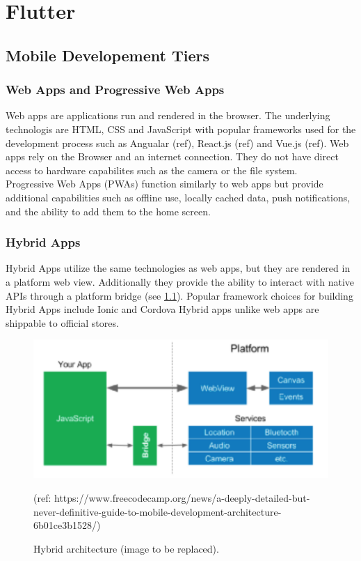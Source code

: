 \chapter{Flutter}

\section{Mobile Developement Tiers} \label{section::other_architectures}
\subsection{Web Apps and Progressive Web Apps}
Web apps are applications run and rendered in the browser. The underlying technologis are HTML, CSS and JavaScript with popular frameworks 
used for the development process such as Angualar (ref), React.js (ref) and Vue.js (ref). Web apps rely on the Browser and an internet connection.
They do not have direct access to hardware capabilites such as the camera or the file system.\\
Progressive Web Apps (PWAs) function similarly to web apps but provide additional capabilities such as offline use, locally cached data, 
push notifications, and the ability to add them to the home screen.

\subsection{Hybrid Apps}
Hybrid Apps utilize the same technologies as web apps, but they are rendered in a platform web view. Additionally they provide the ability to 
interact with native APIs through a platform bridge (see \ref{fig:hybrid_architecture}). 
Popular framework choices for building Hybrid Apps include Ionic and Cordova 
Hybrid apps unlike web apps are shippable to official stores.


\begin{figure}
    \includegraphics[width=\linewidth]{images/architectures/hybrid_architecture.png}
    \caption{Hybrid architecture (image to be replaced).}
    \label{fig:hybrid_architecture}  (ref: https://www.freecodecamp.org/news/a-deeply-detailed-but-never-definitive-guide-to-mobile-development-architecture-6b01ce3b1528/)
\end{figure}

